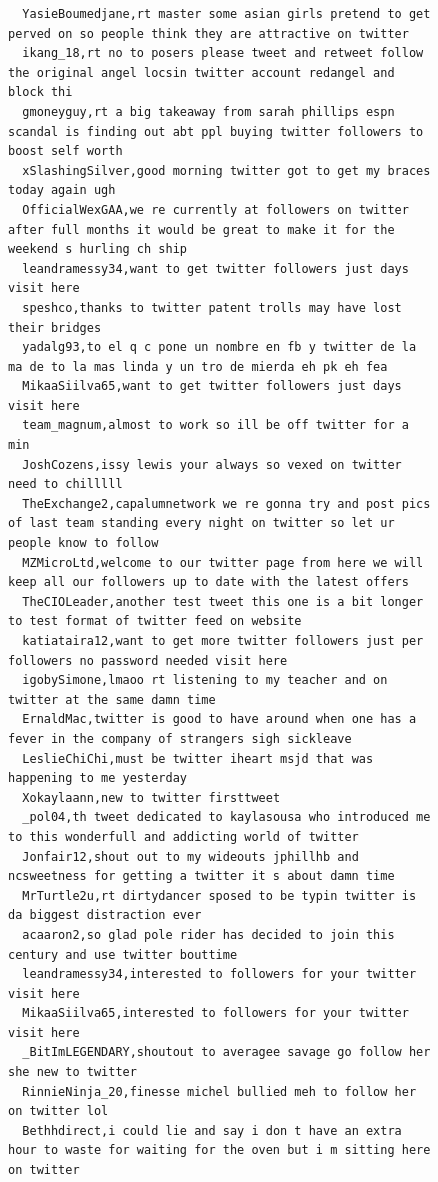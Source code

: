 \begin{figure}[htpb]
\begin{verbatim}
  YasieBoumedjane,rt master some asian girls pretend to get perved on so people think they are attractive on twitter
  ikang_18,rt no to posers please tweet and retweet follow the original angel locsin twitter account redangel and block thi
  gmoneyguy,rt a big takeaway from sarah phillips espn scandal is finding out abt ppl buying twitter followers to boost self worth
  xSlashingSilver,good morning twitter got to get my braces today again ugh
  OfficialWexGAA,we re currently at followers on twitter after full months it would be great to make it for the weekend s hurling ch ship
  leandramessy34,want to get twitter followers just days visit here
  speshco,thanks to twitter patent trolls may have lost their bridges
  yadalg93,to el q c pone un nombre en fb y twitter de la ma de to la mas linda y un tro de mierda eh pk eh fea
  MikaaSiilva65,want to get twitter followers just days visit here
  team_magnum,almost to work so ill be off twitter for a min
  JoshCozens,issy lewis your always so vexed on twitter need to chilllll
  TheExchange2,capalumnetwork we re gonna try and post pics of last team standing every night on twitter so let ur people know to follow
  MZMicroLtd,welcome to our twitter page from here we will keep all our followers up to date with the latest offers
  TheCIOLeader,another test tweet this one is a bit longer to test format of twitter feed on website
  katiataira12,want to get more twitter followers just per followers no password needed visit here
  igobySimone,lmaoo rt listening to my teacher and on twitter at the same damn time
  ErnaldMac,twitter is good to have around when one has a fever in the company of strangers sigh sickleave
  LeslieChiChi,must be twitter iheart msjd that was happening to me yesterday
  Xokaylaann,new to twitter firsttweet
  _pol04,th tweet dedicated to kaylasousa who introduced me to this wonderfull and addicting world of twitter
  Jonfair12,shout out to my wideouts jphillhb and ncsweetness for getting a twitter it s about damn time
  MrTurtle2u,rt dirtydancer sposed to be typin twitter is da biggest distraction ever
  acaaron2,so glad pole rider has decided to join this century and use twitter bouttime
  leandramessy34,interested to followers for your twitter visit here
  MikaaSiilva65,interested to followers for your twitter visit here
  _BitImLEGENDARY,shoutout to averagee savage go follow her she new to twitter
  RinnieNinja_20,finesse michel bullied meh to follow her on twitter lol
  Bethhdirect,i could lie and say i don t have an extra hour to waste for waiting for the oven but i m sitting here on twitter

\end{verbatim}
\end{figure}
